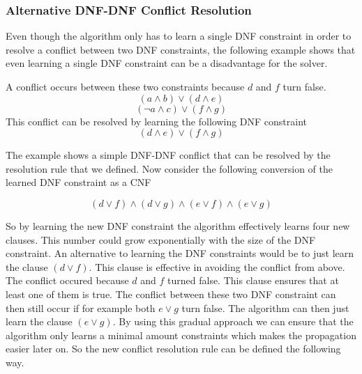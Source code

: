 \subsubsection{Alternative DNF-DNF Conflict Resolution}

Even though the algorithm only has to learn a single DNF constraint in order to resolve a conflict between two DNF constraints, the following example shows that even learning a single DNF constraint can be a disadvantage for the solver.

\begin{leftbar}
A conflict occurs between these two constraints because $d$ and $f$ turn false.
\begin{displaymath}
(a \wedge b) \vee (d \wedge e)
\end{displaymath}
\begin{displaymath}
(\neg a \wedge c) \vee (f \wedge g)
\end{displaymath}
This conflict can be resolved by learning the following DNF constraint
\begin{displaymath}
(d \wedge e) \vee (f \wedge g)
\end{displaymath}
\end{leftbar}

The example shows a simple DNF-DNF conflict that can be resolved by the resolution rule that we defined. Now consider the following conversion of the learned DNF constraint as a CNF

\begin{leftbar}
\begin{displaymath}
(d \vee f) \wedge (d \vee g) \wedge (e \vee f) \wedge (e \vee g)
\end{displaymath}
\end{leftbar}

So by learning the new DNF constraint the algorithm effectively learns four new clauses. This number could grow exponentially with the size of the DNF constraint. An alternative to learning the DNF constraints would be to just learn the clause $(d \vee f)$. This clause is effective in avoiding the conflict from above. The conflict occured because $d$ and $f$ turned false. This clause ensures that at least one of them is true. The conflict between these two DNF constraint can then still occur if for example both $e \vee g$ turn false. The algorithm can then just learn the clause $(e \vee g)$. By using this gradual approach we can ensure that the algorithm only learns a minimal amount constraints which makes the propagation easier later on. So the new conflict resolution rule can be defined the following way.

